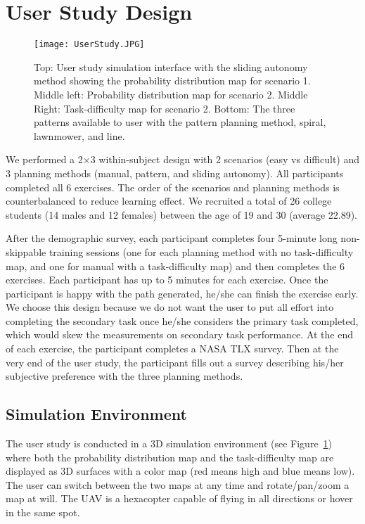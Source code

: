 \section{User Study Design} 
\label{sec:Design}

\begin{figure}
\centering
\texttt{[image: UserStudy.JPG]}
\caption{Top: User study simulation interface with the sliding autonomy method showing the probability distribution map for scenario 1. Middle left: Probability distribution map for scenario 2. Middle Right: Task-difficulty map for scenario 2. Bottom: The three patterns available to user with the pattern planning method, spiral, lawnmower, and line.}
\label{UserStudy}
\end{figure}

We performed a 2$\times$3 within-subject design with 2 scenarios (easy vs difficult) and 3 planning methods (manual, pattern, and sliding autonomy). All participants completed all 6 exercises. The order of the scenarios and planning methods is counterbalanced to reduce learning effect. We recruited a total of 26 college students (14 males and 12 females) between the age of 19 and 30 (average 22.89). 

After the demographic survey, each participant completes four 5-minute long non-skippable training sessions (one for each planning method with no task-difficulty map, and one for manual with a task-difficulty map) and then completes the 6 exercises. Each participant has up to 5 minutes for each exercise. Once the participant is happy with the path generated, he/she can finish the exercise early. We choose this design because we do not want the user to put all effort into completing the secondary task once he/she considers the primary task completed, which would skew the measurements on secondary task performance. At the end of each exercise, the participant completes a NASA TLX survey. Then at the very end of the user study, the participant fills out a survey describing his/her subjective preference with the three planning methods.


\subsection{Simulation Environment}

The user study is conducted in a 3D simulation environment (see Figure~\ref{UserStudy}) where both the probability distribution map and the task-difficulty map are displayed as 3D surfaces with a color map (red means high and blue means low). The user can switch between the two maps at any time and rotate/pan/zoom a map at will. The UAV is a hexacopter capable of flying in all directions or hover in the same spot.

